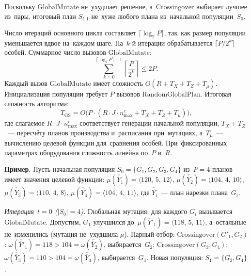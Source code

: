 \begin{center}
\resizebox{!}{0.8\textheight}{%
    
}
\label{alg:genetic_search}
\end{center}

Поскольку $\mathrm{GlobalMutate}$ не~ухудшает решение, а~$\mathrm{Crossingover}$ выбирает лучшее из~пары, итоговый план $S_{t,1}$ не~хуже любого плана из~начальной популяции~$S_0$.

Число итераций основного цикла составляет $\lceil\log_2 P\rceil$, так~как размер популяции уменьшается вдвое на~каждом шаге.
На~$k$-й итерации обрабатывается $\lceil P/2^k\rceil$ особей.
Суммарное число вызовов $\mathrm{GlobalMutate}$:
\[
\sum_{k=0}^{\lceil\log_2 P\rceil-1}\left\lceil\frac{P}{2^k}\right\rceil \le 2P.
\]
Каждый вызов $\mathrm{GlobalMutate}$ имеет сложность $O(R+T_X+T_Z+T_\mu)$.
Инициализация популяции требует $P$ вызовов $\mathrm{RandomGlobalPlan}$.
Итоговая сложность алгоритма:
\begin{equation}
    T_{\mathrm{GS}} = O\!\bigl(P\cdot(R\cdot J\cdot n^c_{\max}+T_X+T_Z+T_\mu)\bigr),
    \label{eq:genetic_search_complexity}
\end{equation}
где слагаемое $R\cdot J\cdot n^c_{\max}$ соответствует генерации начальной популяции, $T_X+T_Z$~--- пересчёту планов производства и~расписания при~мутациях, а~$T_\mu$~--- вычислению целевой функции для~сравнения особей.
При~фиксированных параметрах оборудования сложность линейна по~$P$ и~$R$.

\textbf{Пример.}
Пусть начальная популяция $S_0=\{G_1,G_2,G_3,G_4\}$ из~$P=4$ планов имеет значения целевой функции:
$\mu(\overline{\overline{Y}}_1)=\langle 120,\,5,\,12\rangle$,
$\mu(\overline{\overline{Y}}_2)=\langle 104,\,4,\,10\rangle$,
$\mu(\overline{\overline{Y}}_3)=\langle 110,\,4,\,8\rangle$,
$\mu(\overline{\overline{Y}}_4)=\langle 104,\,4,\,11\rangle$,
где $\overline{\overline{Y}}_i$~--- план нарезки плана~$G_i$.

\emph{Итерация~$t=0$ ($|S_0|=4$).}
Глобальная мутация: для каждого $G_i$ вызывается $\mathrm{GlobalMutate}$.
Допустим, $G_1$ улучшился до~$\mu(\overline{\overline{Y}}'_1)=\langle 118,\,5,\,11\rangle$, а~остальные не~изменились (мутация не~ухудшила $\mu$).
Парный отбор:
$\mathrm{Crossingover}(G'_1,G_2)$: $\omega(\overline{\overline{Y}}'_1)=118>104=\omega(\overline{\overline{Y}}_2)$, выбирается~$G_2$;
$\mathrm{Crossingover}(G_3,G_4)$: $\omega(\overline{\overline{Y}}_3)=110>104=\omega(\overline{\overline{Y}}_4)$, выбирается~$G_4$.
Новая популяция: $S_1=\{G_2,G_4\}$.

